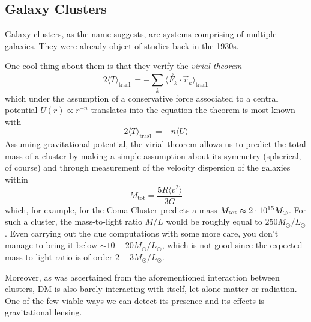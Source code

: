 \subsection{Galaxy Clusters}

Galaxy clusters, as the name suggests, are systems comprising of multiple galaxies. They were already object of studies back in the 1930s.
\par One cool thing about them is that they verify the \emph{virial theorem}
\begin{equation}
    2\langle T \rangle_{\text{trasl.}} = -\sum_{k} \langle \vec{F}_{k}\cdot \vec{r}_{k} \rangle_{\text{trasl.}}
\end{equation}
which under the assumption of a conservative force associated to a central potential $U(r)\propto r^{-n}$ translates into the equation the theorem is most known with
\begin{equation}
     2\langle T \rangle_{\text{trasl.}} = -n\langle U \rangle
\end{equation}
Assuming gravitational potential, the virial theorem allows us to predict the total mass of a cluster by making a simple assumption about its symmetry (spherical, of course) and through measurement of the velocity dispersion of the galaxies within
\begin{equation}
    M_{\text{tot}} = \frac{5R\langle v^{2}\rangle}{3G}
\end{equation}
which, for example, for the Coma Cluster predicts a mass $M_{\text{tot}} \approx 2\cdot 10^{15}M_{\odot}$. For such a cluster, the mass-to-light ratio $M/L$ would be roughly equal to $250M_{\odot}/L_{\odot}$. Even carrying out the due computations with some more care, you don't manage to bring it below $\sim 10-20M_{\odot}/L_{\odot}$, which is not good since the expected mass-to-light ratio is of order $2-3M_{\odot}/L_{\odot}$.
\par Moreover, as was ascertained from the aforementioned interaction between clusters, DM is also barely interacting with itself, let alone matter or radiation. One of the few viable ways we can detect its presence and its effects is gravitational lensing.
